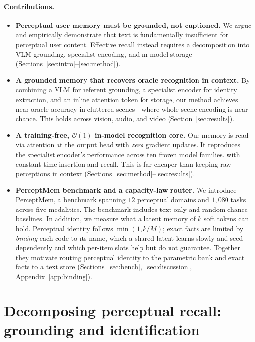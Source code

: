 \paragraph{Contributions.}
\begin{itemize}[leftmargin=*,itemsep=2pt,topsep=2pt]
\item \textbf{Perceptual user memory must be grounded, not captioned.} We argue and empirically demonstrate that text is fundamentally insufficient for perceptual user content. Effective recall instead requires a decomposition into VLM grounding, specialist encoding, and in-model storage (Sections~\ref{sec:intro}--\ref{sec:method}).
\item \textbf{A grounded memory that recovers oracle recognition in context.} By combining a VLM for referent grounding, a specialist encoder for identity extraction, and an inline attention token for storage, our method achieves near-oracle accuracy in cluttered scenes---where whole-scene encoding is near chance. This holds across vision, audio, and video (Section~\ref{sec:results}).
\item \textbf{A training-free, $\mathcal{O}(1)$ in-model recognition core.} Our memory is read via attention at the output head with \emph{zero} gradient updates. It reproduces the specialist encoder's performance across ten frozen model families, with constant-time insertion and recall. This is far cheaper than keeping raw perceptions in context (Sections~\ref{sec:method}--\ref{sec:results}).
\item \textbf{PerceptMem benchmark and a capacity-law router.} We introduce PerceptMem, a benchmark spanning $12$ perceptual domains and $1{,}080$ tasks across five modalities. The benchmark includes text-only and random chance baselines. In addition, we measure what a latent memory of $k$ soft tokens can hold. Perceptual identity follows $\min(1,k/M)$; exact facts are limited by \emph{binding} each code to its name, which a shared latent learns slowly and seed-dependently and which per-item slots help but do not guarantee. Together they motivate routing perceptual identity to the parametric bank and exact facts to a text store (Sections~\ref{sec:bench},~\ref{sec:discussion}, Appendix~\ref{app:binding}).
\end{itemize}


\section{Decomposing perceptual recall: grounding and identification}
\label{sec:why}


